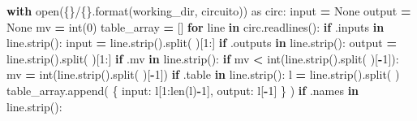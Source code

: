 \documentclass[
  italian,
]{book}
\newenvironment{Shaded}{\begin{snugshade}}{\end{snugshade}}
\newcommand{\BuiltInTok}[1]{#1}
\newcommand{\ControlFlowTok}[1]{\textcolor[rgb]{0.13,0.29,0.53}{\textbf{#1}}}
\newcommand{\DecValTok}[1]{\textcolor[rgb]{0.00,0.00,0.81}{#1}}
\newcommand{\ImportTok}[1]{#1}
\newcommand{\KeywordTok}[1]{\textcolor[rgb]{0.13,0.29,0.53}{\textbf{#1}}}
\newcommand{\NormalTok}[1]{#1}
\newcommand{\OperatorTok}[1]{\textcolor[rgb]{0.81,0.36,0.00}{\textbf{#1}}}
\newcommand{\SpecialCharTok}[1]{\textcolor[rgb]{0.00,0.00,0.00}{#1}}
\newcommand{\StringTok}[1]{\textcolor[rgb]{0.31,0.60,0.02}{#1}}
\newcommand{\VariableTok}[1]{\textcolor[rgb]{0.00,0.00,0.00}{#1}}
\begin{document}
\begin{Shaded}
\begin{Highlighting}[]
\ControlFlowTok{with} \BuiltInTok{open}\NormalTok{(}\StringTok{\textquotesingle{}}\SpecialCharTok{\{\}}\StringTok{/}\SpecialCharTok{\{\}}\StringTok{\textquotesingle{}}\NormalTok{.}\BuiltInTok{format}\NormalTok{(working\_dir, circuito)) }\ImportTok{as}\NormalTok{ circ:}
  \BuiltInTok{input} \OperatorTok{=} \VariableTok{None}
\NormalTok{  output }\OperatorTok{=} \VariableTok{None}
\NormalTok{  mv }\OperatorTok{=} \BuiltInTok{int}\NormalTok{(}\DecValTok{0}\NormalTok{)}
\NormalTok{  table\_array }\OperatorTok{=}\NormalTok{ []}
  \ControlFlowTok{for}\NormalTok{ line }\KeywordTok{in}\NormalTok{ circ.readlines():}
    \ControlFlowTok{if} \StringTok{\textquotesingle{}.inputs\textquotesingle{}} \KeywordTok{in}\NormalTok{ line.strip():}
      \BuiltInTok{input} \OperatorTok{=}\NormalTok{ line.strip().split(}\StringTok{\textquotesingle{} \textquotesingle{}}\NormalTok{)[}\DecValTok{1}\NormalTok{:]}
    \ControlFlowTok{if} \StringTok{\textquotesingle{}.outputs\textquotesingle{}} \KeywordTok{in}\NormalTok{ line.strip():}
\NormalTok{      output }\OperatorTok{=}\NormalTok{ line.strip().split(}\StringTok{\textquotesingle{} \textquotesingle{}}\NormalTok{)[}\DecValTok{1}\NormalTok{:]}
    \ControlFlowTok{if} \StringTok{\textquotesingle{}.mv\textquotesingle{}} \KeywordTok{in}\NormalTok{ line.strip():}
      \ControlFlowTok{if}\NormalTok{ mv }\OperatorTok{\textless{}} \BuiltInTok{int}\NormalTok{(line.strip().split(}\StringTok{\textquotesingle{} \textquotesingle{}}\NormalTok{)[}\OperatorTok{{-}}\DecValTok{1}\NormalTok{]):}
\NormalTok{        mv }\OperatorTok{=} \BuiltInTok{int}\NormalTok{(line.strip().split(}\StringTok{\textquotesingle{} \textquotesingle{}}\NormalTok{)[}\OperatorTok{{-}}\DecValTok{1}\NormalTok{])}
    \ControlFlowTok{if} \StringTok{\textquotesingle{}.table\textquotesingle{}} \KeywordTok{in}\NormalTok{ line.strip():}
\NormalTok{      l }\OperatorTok{=}\NormalTok{ line.strip().split(}\StringTok{\textquotesingle{} \textquotesingle{}}\NormalTok{)}
\NormalTok{      table\_array.append(}
\NormalTok{        \{}
          \StringTok{\textquotesingle{}input\textquotesingle{}}\NormalTok{:    l[}\DecValTok{1}\NormalTok{:}\BuiltInTok{len}\NormalTok{(l)}\OperatorTok{{-}}\DecValTok{1}\NormalTok{],}
          \StringTok{\textquotesingle{}output\textquotesingle{}}\NormalTok{:   l[}\OperatorTok{{-}}\DecValTok{1}\NormalTok{]}
\NormalTok{        \}}
\NormalTok{      )}
    \ControlFlowTok{if} \StringTok{\textquotesingle{}.names\textquotesingle{}} \KeywordTok{in}\NormalTok{ line.strip():}

\end{Highlighting}
\end{Shaded}
\end{document}
